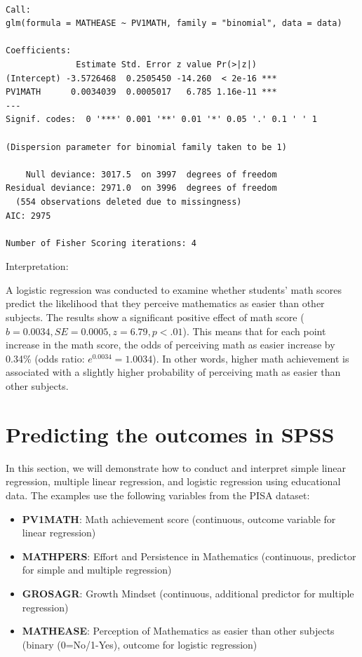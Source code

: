 \documentclass[
  letterpaper,
  DIV=11,
  numbers=noendperiod]{scrreprt}
\begin{document}
\begin{verbatim}

Call:
glm(formula = MATHEASE ~ PV1MATH, family = "binomial", data = data)

Coefficients:
              Estimate Std. Error z value Pr(>|z|)    
(Intercept) -3.5726468  0.2505450 -14.260  < 2e-16 ***
PV1MATH      0.0034039  0.0005017   6.785 1.16e-11 ***
---
Signif. codes:  0 '***' 0.001 '**' 0.01 '*' 0.05 '.' 0.1 ' ' 1

(Dispersion parameter for binomial family taken to be 1)

    Null deviance: 3017.5  on 3997  degrees of freedom
Residual deviance: 2971.0  on 3996  degrees of freedom
  (554 observations deleted due to missingness)
AIC: 2975

Number of Fisher Scoring iterations: 4
\end{verbatim}

Interpretation:

A logistic regression was conducted to examine whether students' math
scores predict the likelihood that they perceive mathematics as easier
than other subjects. The results show a significant positive effect of
math score (\(b=0.0034, SE=0.0005,z=6.79,p<.01\)). This means that for
each point increase in the math score, the odds of perceiving math as
easier increase by 0.34\% (odds ratio: \(e^{0.0034} = 1.0034\)). In
other words, higher math achievement is associated with a slightly
higher probability of perceiving math as easier than other subjects.


\chapter*{Predicting the outcomes in
SPSS}\label{predicting-the-outcomes-in-spss}


In this section, we will demonstrate how to conduct and interpret simple
linear regression, multiple linear regression, and logistic regression
using educational data. The examples use the following variables from
the PISA dataset:

\begin{itemize}
\item
  \textbf{PV1MATH}: Math achievement score (continuous, outcome variable
  for linear regression)
\item
  \textbf{MATHPERS}: Effort and Persistence in Mathematics (continuous,
  predictor for simple and multiple regression)
\item
  \textbf{GROSAGR}: Growth Mindset (continuous, additional predictor for
  multiple regression)
\item
  \textbf{MATHEASE}: Perception of Mathematics as easier than other
  subjects (binary (0=No/1-Yes), outcome for logistic regression)
\end{itemize}
\end{document}
